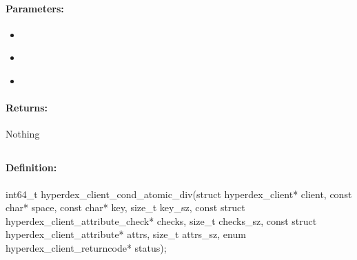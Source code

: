 \paragraph{Parameters:}
\begin{itemize}[noitemsep]
\item {}\\

\item {}\\

\item {}\\

\end{itemize}

\paragraph{Returns:}
Nothing
\pagebreak
\subsection{}
\label{api:c:cond_atomic_div}


\paragraph{Definition:}
\begin{ccode}
int64_t hyperdex_client_cond_atomic_div(struct hyperdex_client* client,
        const char* space,
        const char* key, size_t key_sz,
        const struct hyperdex_client_attribute_check* checks, size_t checks_sz,
        const struct hyperdex_client_attribute* attrs, size_t attrs_sz,
        enum hyperdex_client_returncode* status);
\end{ccode}

